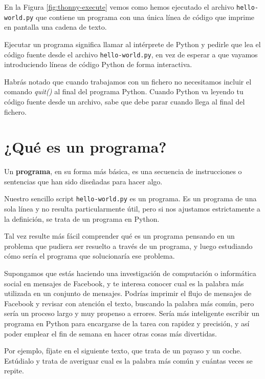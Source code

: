 En la Figura \ref{fig:thonny-execute} vemos como hemos ejecutado el archivo \verb|hello-world.py| que contiene
un programa con una única línea de código que imprime en pantalla una cadena de texto.

Ejecutar un programa significa llamar al intérprete de Python y pedirle que lea el código fuente
desde el archivo \verb|hello-world.py|, en vez de esperar a que vayamos
introduciendo líneas de código Python de forma interactiva.

Habrás notado que cuando trabajamos con un fichero no necesitamos
incluir el comando \emph{quit()} al final del programa Python. Cuando
Python va leyendo tu código fuente desde un archivo, sabe que debe parar
cuando llega al final del fichero.

\hypertarget{quuxe9-es-un-programa}{%
\section{¿Qué es un programa?}\label{quuxe9-es-un-programa}}

\begin{definition}
Un \textbf{programa}, en su forma más básica, es una
secuencia de instrucciones o sentencias que han sido diseñadas para
hacer algo. 
\end{definition}

Nuestro sencillo script \verb|hello-world.py| es un programa.
Es un programa de una sola línea y no resulta particularmente útil, pero
si nos ajustamos estrictamente a la definición, se trata de un programa
en Python.

Tal vez resulte más fácil comprender qué es un programa pensando en un
problema que pudiera ser resuelto a través de un programa, y luego
estudiando cómo sería el programa que solucionaría ese problema.

Supongamos que estás haciendo una investigación de computación o
informática social en mensajes de Facebook, y te interesa conocer cual
es la palabra más utilizada en un conjunto de mensajes. Podrías imprimir
el flujo de mensajes de Facebook y revisar con atención el texto,
buscando la palabra más común, pero sería un proceso largo y muy
propenso a errores. Sería más inteligente escribir un programa en Python
para encargarse de la tarea con rapidez y precisión, y así poder emplear
el fin de semana en hacer otras cosas más divertidas.

Por ejemplo, fíjate en el siguiente texto, que trata de un payaso y un
coche. Estúdialo y trata de averiguar cual es la palabra más común y
cuántas veces se repite.

